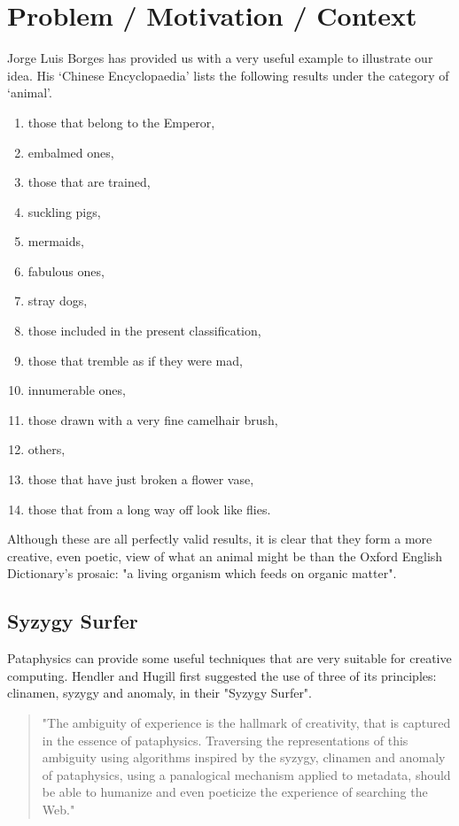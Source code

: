 \section{Problem / Motivation / Context}

Jorge Luis Borges has provided us with a very useful example to illustrate our idea. His ‘Chinese Encyclopaedia' \citep{Borges2000} lists the following results under the category of ‘animal'.

\begin{enumerate}
  \item those that belong to the Emperor,
  \item embalmed ones,
  \item those that are trained,
  \item suckling pigs,
  \item mermaids,
  \item fabulous ones,
  \item stray dogs,
  \item those included in the present classification,
  \item those that tremble as if they were mad,
  \item innumerable ones,
  \item those drawn with a very fine camelhair brush,
  \item others,
  \item those that have just broken a flower vase,
  \item those that from a long way off look like flies.
\end{enumerate}

Although these are all perfectly valid results, it is clear that they form a more creative, even poetic, view of what an animal might be than the Oxford English Dictionary's prosaic: "a living organism which feeds on organic matter".

\subsection{Syzygy Surfer}

Pataphysics can provide some useful techniques that are very suitable for creative computing. Hendler and Hugill first suggested the use of three of its principles: clinamen, syzygy and anomaly, in their "Syzygy Surfer".

\begin{quote}
  "The ambiguity of experience is the hallmark of creativity, that is captured in the essence of pataphysics. Traversing the representations of this ambiguity using algorithms inspired by the syzygy, clinamen and anomaly of pataphysics, using a panalogical mechanism applied to metadata, should be able to humanize and even poeticize the experience of searching the Web." \citep{Hendler2013}
\end{quote}

